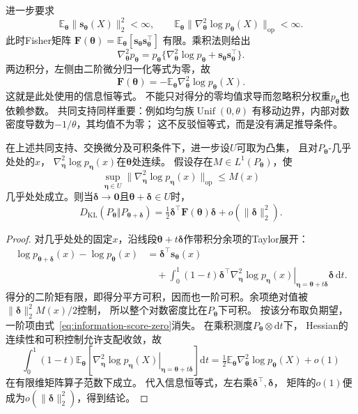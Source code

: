 进一步要求
\[
  \mathbb E_{\bm\theta}\|\bm s_{\bm\theta}(X)\|_2^2<\infty,\qquad
  \mathbb E_{\bm\theta}
  \|\nabla^2_{\bm\theta}\log p_{\bm\theta}(X)\|_{\mathrm{op}}<\infty.
\]
此时Fisher矩阵
\(\bm F(\bm\theta)=\mathbb E_{\bm\theta}[\bm s_{\bm\theta}\bm s_{\bm\theta}^\top]\)
有限。乘积法则给出
\[
  \nabla^2_{\bm\theta}p_{\bm\theta}
  =p_{\bm\theta}
   \{\nabla^2_{\bm\theta}\log p_{\bm\theta}
      +\bm s_{\bm\theta}\bm s_{\bm\theta}^\top\}.
\]
两边积分，左侧由二阶微分归一化等式为零，故
\begin{equation}
  \bm F(\bm\theta)
  =-\mathbb E_{\bm\theta}\nabla^2_{\bm\theta}\log p_{\bm\theta}(X).
  \label{eq:information-fisher-hessian-identity}
\end{equation}
这就是此处使用的信息恒等式。
不能只对得分的零均值求导而忽略积分权重\(p_{\bm\theta}\)也依赖参数。
共同支持同样重要：例如均匀族\(\operatorname{Unif}(0,\theta)\)
有移动边界，内部对数密度导数为\(-1/\theta\)，其均值不为零；
这不反驳恒等式，而是没有满足推导条件。

\begin{theorem}[KL的局部二阶展开]
\label{thm:information-kl-local-fisher}
在上述共同支持、交换微分及可积条件下，进一步设\(U\)可取为凸集，
且对\(P_{\bm\theta}\)-几乎处处的\(x\)，
\(\nabla^2_{\bm\eta}\log p_{\bm\eta}(x)\)在\(\bm\theta\)处连续。
假设存在\(M\in L^1(P_{\bm\theta})\)，使
\[
  \sup_{\bm\eta\in U}
  \|\nabla^2_{\bm\eta}\log p_{\bm\eta}(x)\|_{\mathrm{op}}\leq M(x)
\]
几乎处处成立。则当\(\bm\delta\to\bm0\)且\(\bm\theta+\bm\delta\in U\)时，
\begin{equation}
  D_{\mathrm{KL}}(P_{\bm\theta}\Vert P_{\bm\theta+\bm\delta})
  =\tfrac12\bm\delta^\top\bm F(\bm\theta)\bm\delta
   +o(\|\bm\delta\|_2^2).
  \label{eq:information-kl-fisher-expansion}
\end{equation}
\end{theorem}
\begin{proof}
对几乎处处的固定\(x\)，沿线段\(\bm\theta+t\bm\delta\)作带积分余项的Taylor展开：
\[
\begin{aligned}
  \log p_{\bm\theta+\bm\delta}(x)-\log p_{\bm\theta}(x)
  &=\bm\delta^\top\bm s_{\bm\theta}(x)\\
  &\quad+\int_0^1(1-t)\bm\delta^\top
  \left.\nabla^2_{\bm\eta}\log p_{\bm\eta}(x)
  \right|_{\bm\eta=\bm\theta+t\bm\delta}
  \bm\delta\,\mathrm dt.
\end{aligned}
\]
得分的二阶矩有限，即得分平方可积，因而也一阶可积。余项绝对值被
\(\|\bm\delta\|_2^2M(x)/2\)控制，
所以整个对数密度比在\(P_{\bm\theta}\)下可积。
按该分布取负期望，一阶项由式~\eqref{eq:information-score-zero}消失。
在乘积测度\(P_{\bm\theta}\otimes\mathrm dt\)下，
Hessian的连续性和可积控制允许支配收敛，故
\[
  \int_0^1(1-t)\mathbb E_{\bm\theta}
  \left[
    \left.\nabla^2_{\bm\eta}\log p_{\bm\eta}(X)
    \right|_{\bm\eta=\bm\theta+t\bm\delta}
  \right]\mathrm dt
  =\tfrac12\mathbb E_{\bm\theta}\nabla^2_{\bm\theta}
    \log p_{\bm\theta}(X)+o(1)
\]
在有限维矩阵算子范数下成立。
代入信息恒等式，左右乘\(\bm\delta^\top,\bm\delta\)，
矩阵的\(o(1)\)便成为\(o(\|\bm\delta\|_2^2)\)，得到结论。
\end{proof}

